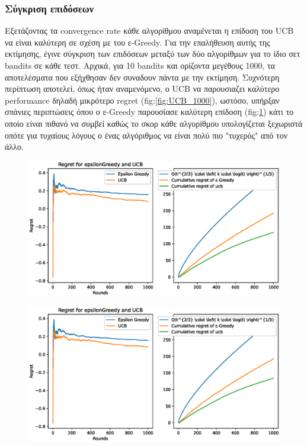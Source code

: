 \subsubsection*{Σύγκριση επιδόσεων}

Εξετάζοντας τα convergence rate κάθε αλγορίθμου αναμένεται η επίδοση του UCB να είναι καλύτερη σε σχέση με του ε-Greedy. Για την επαλήθευση αυτής της εκτίμησης, έγινε σύγκριση των επιδόσεων μεταξύ των δύο αλγορίθμων για το ίδιο σετ bandits σε κάθε τεστ. Αρχικά, για 10 bandits και ορίζοντα μεγέθους 1000, τα αποτελέσματα που εξήχθησαν δεν συναδουν πάντα με την εκτίμηση. Συχνότερη περίπτωση αποτελεί, όπως ήταν αναμενόμενο, ο UCB να παρουσιαζει καλύτερο performance δηλαδή μικρότερο regret (fig:\ref{fig:UCB_1000}), ωστόσο, υπήρξαν σπάνιες περιπτώσεις όπου ο ε-Greedy παρουσίασε καλύτερη επίδοση (fig:\ref{fig:epsilon_1000}) κάτι το οποίο είναι πιθανό να συμβεί καθώς το σκορ κάθε αλγορίθμου υπολογίζεται ξεχωριστά οπότε για τυχαίους λόγους ο ένας αλγόριθμος να είναι πολύ πιο "τυχερός" από τον άλλο. 

\begin{figure}[h]
	\centering
	\begin{minipage}{.5\textwidth}
	  \centering
	  \includegraphics[width=1\linewidth]{Images/Regret10_1000.eps}
	  \label{fig:UCB_1000}
	\end{minipage}%
	\begin{minipage}{.5\textwidth}
		\centering
		\includegraphics[width=1\linewidth]{Images/Regret10_1000.eps}
		\label{fig:epsilon_1000}
	\end{minipage}
\end{figure}
\clearpage

